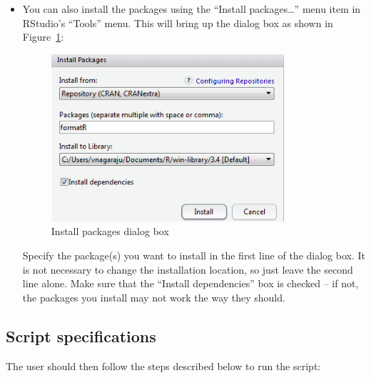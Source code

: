 \documentclass[conference]{IEEEtran}
\begin{document}
\begin{itemize}
{\begin{itemize}
{\begin{itemize}
          \item {\textbf{formatR} - is a package designed to reformat R code to improve readability.}
        \end{itemize}
        }
        \item {You can also install the packages using the “Install packages…” menu item in RStudio’s “Tools” menu. This will bring up the dialog box as shown in Figure~\ref{fig:InstallPackages}:
        \begin{figure}[!h]
        \centering
        \includegraphics[width=3.4in]{Figures/InstallPackages}
        \caption{Install packages dialog box}
        \label{fig:InstallPackages}
        \end{figure}

        \noindent Specify the package(s) you want to install in the first line of the dialog box. It is not necessary to change the installation location, so just leave the second line alone. Make sure that the ``Install dependencies'' box is checked – if not, the packages you install may not work the way they should.
        }
      \end{itemize}
      }
\end{itemize}

\subsection{Script specifications}\label{sec:ScriptRun}
The user should then follow the steps described below to run the script:
\end{document}
